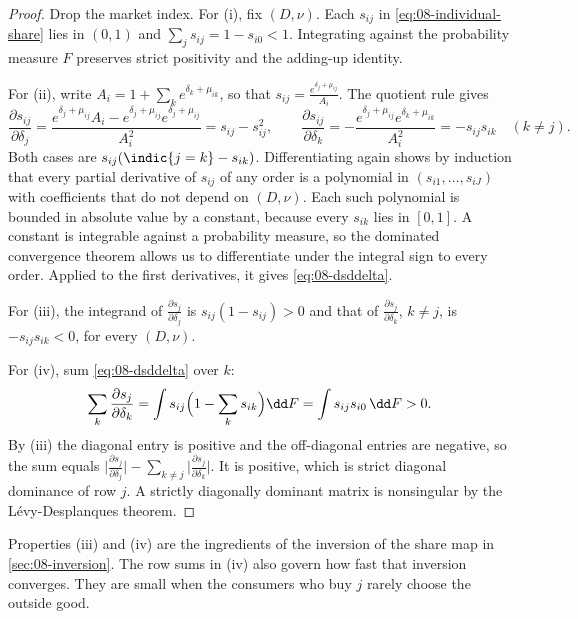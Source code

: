 \begin{proof}
Drop the market index. For (i), fix $(D, \nu)$. Each $s_{ij}$ in \eqref{eq:08-individual-share} lies in
$(0, 1)$ and $\sum_j s_{ij} = 1 - s_{i0} < 1$. Integrating against the probability measure $F$ preserves strict
positivity and the adding-up identity.

For (ii), write $A_i = 1 + \sum_k e^{\delta_k + \mu_{ik}}$, so that $s_{ij} = \frac{e^{\delta_j +
\mu_{ij}}}{A_i}$. The quotient rule gives
\begin{equation*}
  \frac{\partial s_{ij}}{\partial \delta_j} = \frac{e^{\delta_j + \mu_{ij}}A_i - e^{\delta_j + \mu_{ij}}
  e^{\delta_j + \mu_{ij}}}{A_i^2} = s_{ij} - s_{ij}^2,
  \qquad
  \frac{\partial s_{ij}}{\partial \delta_k} = -\frac{e^{\delta_j + \mu_{ij}}e^{\delta_k + \mu_{ik}}}{A_i^2}
  = -s_{ij}s_{ik} \quad (k \ne j).
\end{equation*}
Both cases are $s_{ij}(\indic\{j = k\} - s_{ik})$. Differentiating again shows by induction that every partial
derivative of $s_{ij}$ of any order is a polynomial in $(s_{i1}, \dots, s_{iJ})$ with coefficients that do not
depend on $(D, \nu)$. Each such polynomial is bounded in absolute value by a constant, because every $s_{ik}$
lies in $[0, 1]$. A constant is integrable against a probability measure, so the dominated convergence theorem
allows us to differentiate under the integral sign to every order. Applied to the first derivatives, it gives
\eqref{eq:08-dsddelta}.

For (iii), the integrand of $\frac{\partial s_j}{\partial \delta_j}$ is $s_{ij}(1 - s_{ij}) > 0$ and that of
$\frac{\partial s_j}{\partial \delta_k}$, $k \ne j$, is $-s_{ij}s_{ik} < 0$, for every $(D, \nu)$.

For (iv), sum \eqref{eq:08-dsddelta} over $k$:
\begin{equation*}
  \sum_{k}\frac{\partial s_j}{\partial \delta_k} = \int s_{ij}\Bigl(1 - \sum_k s_{ik}\Bigr)\dd F
  = \int s_{ij}s_{i0}\, \dd F > 0.
\end{equation*}
By (iii) the diagonal entry is positive and the off-diagonal entries are negative, so the sum equals
$\bigl|\frac{\partial s_j}{\partial \delta_j}\bigr| - \sum_{k \ne j}\bigl|\frac{\partial s_j}{\partial
\delta_k}\bigr|$. It is positive, which is strict diagonal dominance of row $j$. A strictly diagonally
dominant matrix is nonsingular by the L\'evy-Desplanques theorem.
\end{proof}

Properties (iii) and (iv) are the ingredients of the inversion of the share map in \cref{sec:08-inversion}.
The row sums in (iv) also govern how fast that inversion converges. They are small when the consumers who buy
$j$ rarely choose the outside good.

